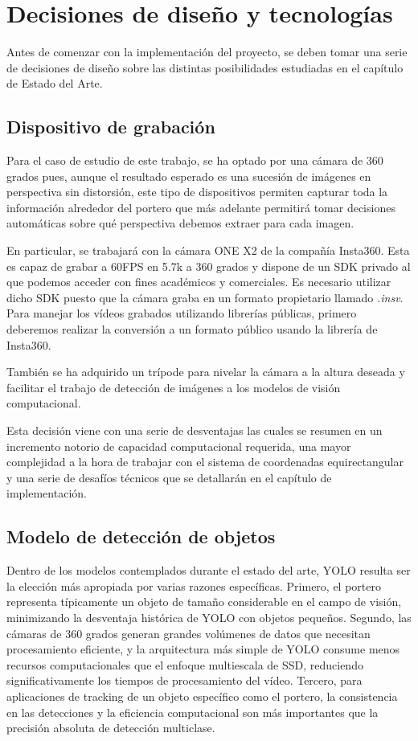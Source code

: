 \section[Decisiones de diseño]{Decisiones de diseño y tecnologías}
Antes de comenzar con la implementación del proyecto, se deben tomar una serie de decisiones de diseño sobre las distintas posibilidades estudiadas en el capítulo de Estado del Arte.

\subsection{Dispositivo de grabación}

Para el caso de estudio de este trabajo, se ha optado por una cámara de 360 grados pues, aunque el resultado esperado es una sucesión de imágenes en perspectiva sin distorsión, este tipo de dispositivos permiten capturar toda la información alrededor del portero que más adelante permitirá tomar decisiones automáticas sobre qué perspectiva debemos extraer para cada imagen.

En particular, se trabajará con la cámara ONE X2 de la compañía Insta360. Esta es capaz de grabar a 60FPS en 5.7k a 360 grados y dispone de un SDK privado al que podemos acceder con fines académicos y comerciales. Es necesario utilizar dicho SDK puesto que la cámara graba en un formato propietario llamado \textit{.insv}. Para manejar los vídeos grabados utilizando librerías públicas, primero deberemos realizar la conversión a un formato público usando la librería de Insta360.

También se ha adquirido un trípode para nivelar la cámara a la altura deseada y facilitar el trabajo de detección de imágenes a los modelos de visión computacional.

Esta decisión viene con una serie de desventajas las cuales se resumen en un incremento notorio de capacidad computacional requerida, una mayor complejidad a la hora de trabajar con el sistema de coordenadas equirectangular y una serie de desafíos técnicos que se detallarán en el capítulo de implementación.

\subsection{Modelo de detección de objetos}

Dentro de los modelos contemplados durante el estado del arte, YOLO resulta ser la elección más apropiada por varias razones específicas. Primero, el portero representa típicamente un objeto de tamaño considerable en el campo de visión, minimizando la desventaja histórica de YOLO con objetos pequeños. Segundo, las cámaras de 360 grados generan grandes volúmenes de datos que necesitan procesamiento eficiente, y la arquitectura más simple de YOLO consume menos recursos computacionales que el enfoque multiescala de SSD, reduciendo significativamente los tiempos de procesamiento del vídeo. Tercero, para aplicaciones de tracking de un objeto específico como el portero, la consistencia en las detecciones y la eficiencia computacional son más importantes que la precisión absoluta de detección multiclase.

